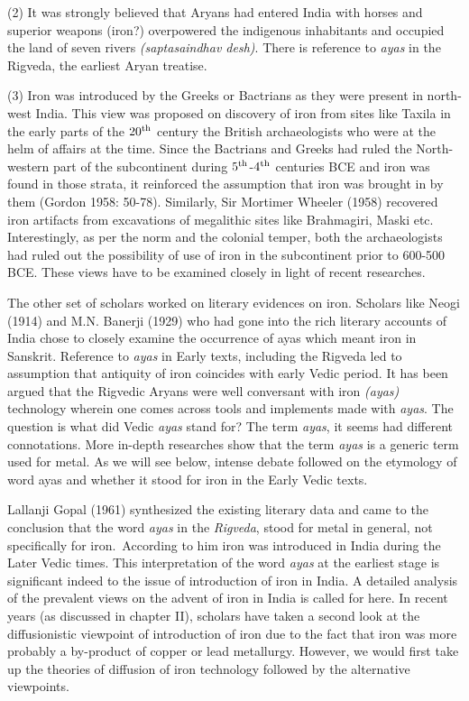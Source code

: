 
 
(2) It was strongly believed that Aryans had entered India with horses and superior weapons (iron?) overpowered the indigenous inhabitants and occupied the land of seven rivers \textit{(saptasaindhav desh)}. There is reference to \textit{ayas} in the Rigveda, the earliest Aryan treatise. 
 
 (3) Iron was introduced by the Greeks or Bactrians as they were present in north-west India. This view was proposed on discovery of iron from sites like Taxila in the early parts of the $20^{\rm th}$ century the British archaeologists who were at the helm of affairs at the time. Since the Bactrians and Greeks had ruled the North-western part of the subcontinent during $5^{\rm th}$-$4^{\rm th}$ centuries BCE and iron was found in those strata, it reinforced the assumption that iron was brought in by them (Gordon 1958: 50-78). Similarly, Sir Mortimer Wheeler (1958) recovered iron artifacts from excavations of megalithic sites like Brahmagiri, Maski etc. Interestingly, as per the norm and the colonial temper, both the archaeologists had ruled out the possibility of use of iron in the subcontinent prior to 600-500 BCE. These views have to be examined closely in light of recent researches. 
 
The other set of scholars worked on literary evidences on iron. Scholars like Neogi (1914) and M.N. Banerji (1929) who had gone into the rich literary accounts of India chose to closely examine the occurrence of ayas which meant iron in Sanskrit. Reference to \textit{ayas} in Early texts, including the Rigveda led to assumption that antiquity of iron coincides with early Vedic period. It has been argued that the Rigvedic Aryans were well conversant with iron \textit{(ayas)} technology wherein one comes across tools and implements made with \textit{ayas}. The question is what did Vedic \textit{ayas} stand for? The term \textit{ayas}, it seems had different connotations. More in-depth researches show that the term \textit{ayas} is a generic term used for metal. As we will see below, intense debate followed on the etymology of word ayas and whether it stood for iron in the Early Vedic texts.


Lallanji Gopal (1961) synthesized the existing literary data and came to the conclusion that the word \textit{ayas} in the \textit{Rigveda}, stood for metal in general, not specifically for iron.~According to him iron was introduced in India during the Later Vedic times. This interpretation of the word \textit{ayas} at the earliest stage is significant indeed to the issue of introduction of iron in India. A detailed analysis of the prevalent views on the advent of iron in India is called for here. In recent years (as discussed in chapter II), scholars have taken a second look at the diffusionistic viewpoint of introduction of iron due to the fact that iron was more probably a by-product of copper or lead metallurgy. However, we would first take up the theories of diffusion of iron technology followed by the alternative viewpoints. 

